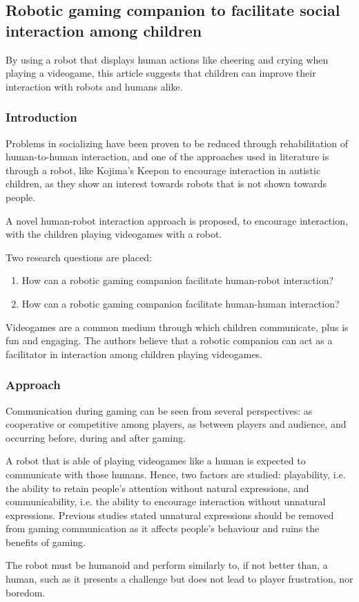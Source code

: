 \documentclass[runningheads]{llncs}
\begin{document}
\subsection{Robotic gaming companion to facilitate social interaction among children}
\par By using a robot that displays human actions like cheering and crying when playing a videogame, this article suggests that children can improve their interaction with robots and humans alike.

\subsubsection{Introduction}
\par Problems in socializing have been proven to be reduced through rehabilitation of human-to-human interaction, and one of the approaches used in literature is through a robot, like Kojima's Keepon to encourage interaction in autistic children, as they show an interest towards robots that is not shown towards people.
\par A novel human-robot interaction approach is proposed, to encourage interaction, with the children playing videogames with a robot. 
\par Two research questions are placed:
\begin{enumerate}
    \item How can a robotic gaming companion facilitate human-robot interaction?
    \item How can a robotic gaming companion facilitate human-human interaction?
\end{enumerate}
\par Videogames are a common medium through which children communicate, plus is fun and engaging. The authors believe that a robotic companion can act as a facilitator in interaction among children playing videogames.

\subsubsection{Approach}
\par Communication during gaming can be seen from several perspectives: as cooperative or competitive among players, as between players and audience, and occurring before, during and after gaming.
\par A robot that is able of playing videogames like a human is expected to communicate with those humans. Hence, two factors are studied: playability, i.e. the ability to retain people's attention without natural expressions, and communicability, i.e. the ability to encourage interaction without unnatural expressions. Previous studies stated unnatural expressions should be removed from gaming communication as it affects people's behaviour and ruins the benefits of gaming.
\par The robot must be humanoid and perform similarly to, if not better than, a human, such as it presents a challenge but does not lead to player frustration, nor boredom.
\end{document}
